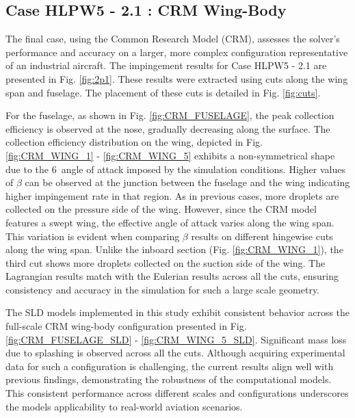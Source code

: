 \FloatBarrier

\subsection{Case HLPW5 - 2.1 : CRM Wing-Body}
The final case, using the Common Research Model (CRM), assesses the solver’s performance and accuracy on a larger, more complex configuration representative of an industrial aircraft. The impingement results for Case HLPW5 - 2.1 are presented in Fig. \ref{fig:2p1}. These results were extracted using cuts along the wing span and fuselage. The placement of these cuts is detailed in Fig. \ref{fig:cuts}. 

For the fuselage, as shown in Fig. \ref{fig:CRM_FUSELAGE}, the peak collection efficiency is observed at the nose, gradually decreasing along the surface. The collection efficiency distribution on the wing, depicted in Fig. \ref{fig:CRM_WING_1} - \ref{fig:CRM_WING_5} exhibits a non-symmetrical shape due to the 6\textdegree $\,$ angle of attack imposed by the simulation conditions. Higher values of $\beta$ can be observed at the junction between the fuselage and the wing indicating higher impingement rate in that region. As in previous cases, more droplets are collected on the pressure side of the wing. However, since the CRM model features a swept wing, the effective angle of attack varies along the wing span. This variation is evident when comparing $\beta$ results on different hingewise cuts along the wing span. Unlike the inboard section (Fig. \ref{fig:CRM_WING_1}), the third cut shows more droplets collected on the suction side of the wing. The Lagrangian results match with the Eulerian results across all the cuts, ensuring consistency and accuracy in the simulation for such a large scale geometry.

The SLD models implemented in this study exhibit consistent behavior across the full-scale CRM wing-body configuration presented in Fig. \ref{fig:CRM_FUSELAGE_SLD} - \ref{fig:CRM_WING_5_SLD}. Significant mass loss due to splashing is observed across all the cuts. Although acquiring experimental data for such a configuration is challenging, the current results align well with previous findings, demonstrating the robustness of the computational models. This consistent performance across different scales and configurations underscores the models applicability to real-world aviation scenarios.

